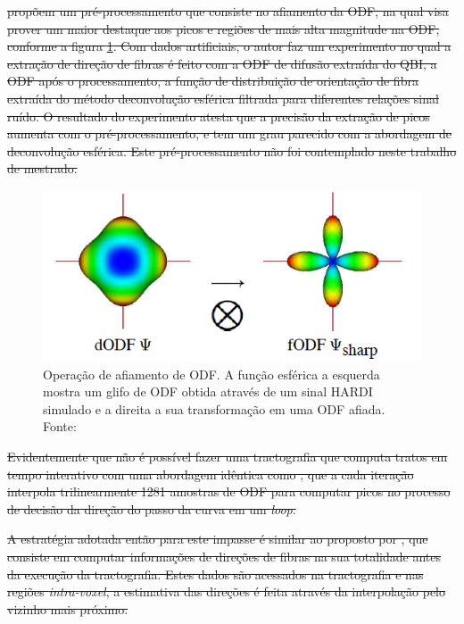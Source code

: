 \documentclass[
    12pt,                %
    oneside,            %
    a4paper,            %
    english,            %
    french,                %
    spanish,            %
    brazil                %
    ]{abntex2}
\begin{document}
\sout{
 propõem um pré-processamento que consiste no afiamento da ODF, na qual visa prover um maior destaque aos picos e regiões de mais alta magnitude na ODF, conforme a figura \ref{fig::sharpening}. Com dados artificiais, o autor faz um experimento no qual a extração de direção de fibras é feito com a ODF de difusão extraída do QBI, a ODF após o processamento, a função de distribuição de orientação de fibra extraída do método deconvolução esférica filtrada para diferentes relações sinal ruído. O resultado do experimento atesta que a precisão da extração de picos aumenta com o pré-processamento, e tem um grau parecido com a abordagem de deconvolução esférica. Este pré-processamento não foi contemplado neste trabalho de mestrado.
}



\begin{figure}[h]
    \centering
    \includegraphics[width=.45\linewidth, angle=0]{figs/Tractografia/sharpening.png}
     \caption{Operação de afiamento de ODF. A função esférica a esquerda mostra um glifo de ODF obtida através de um sinal HARDI simulado e a direita a sua transformação em uma ODF afiada. \\
     Fonte: \cite{descoteaux2007}
     }
     \label{fig::sharpening}
\end{figure}

\sout{
Evidentemente que não é possível fazer uma tractografia que computa tratos em tempo interativo com uma abordagem idêntica como , que a cada iteração interpola trilinearmente 1281 amostras de ODF para computar picos no processo de decisão da direção do passo da curva em um \textit{loop}.
}

\sout{
A estratégia adotada então para este impasse é similar ao proposto por , que consiste em computar informações de direções de fibras na sua totalidade antes da execução da tractografia. Estes dados são acessados na tractografia e nas regiões \textit{intra-voxel}, a estimativa das direções é feita através da interpolação pelo vizinho mais próximo.
}
\end{document}
